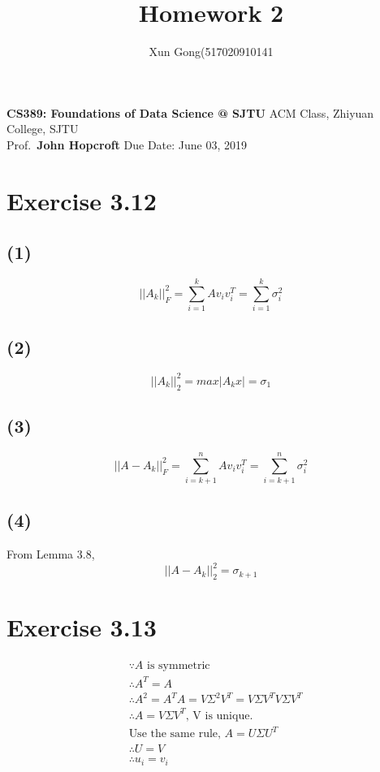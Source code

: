 \documentclass[a4paper, 11pt]{article}
\author{Xun Gong(517020910141}
\title{Homework 2}
\begin{document}
\maketitle

\noindent
\normalsize {\bf CS389: Foundations of Data Science @ SJTU} \hfill ACM Class, Zhiyuan College, SJTU\\
Prof.~{\bf John Hopcroft} \hfill Due Date: June 03, 2019\\

\section*{Exercise 3.12}

\subsection*{(1)}

$$||A_k||_F^2 = \sum_{i=1}^k A v_i v_i^T = \sum_{i=1}^k \sigma_i^2  $$


\subsection*{(2)}

$$||A_k||_2^2 = max|A_k x| = \sigma_1 $$

\subsection*{(3)}

$$||A - A_k||_F^2 = \sum_{i=k+1}^n A v_i v_i^T = \sum_{i=k+1}^n \sigma_i^2 $$

\subsection*{(4)}
From Lemma 3.8, 
$$||A - A_k||_2^2 = \sigma_{k+1} $$

\section*{Exercise 3.13}


\begin{align*}
    & \because   A \text{ is symmetric} \\
    & \therefore A^T = A \\
    & \therefore A^2 = A^T A = V\Sigma^2 V^T = V \Sigma V^T V \Sigma V^T \\
    & \therefore A = V \Sigma V^T \text{, V is unique.} \\
    & \text{Use the same rule, } A = U \Sigma U^T \\
    & \therefore U = V \\
    & \therefore u_i = v_i \\
\end{align*}
\end{document}
